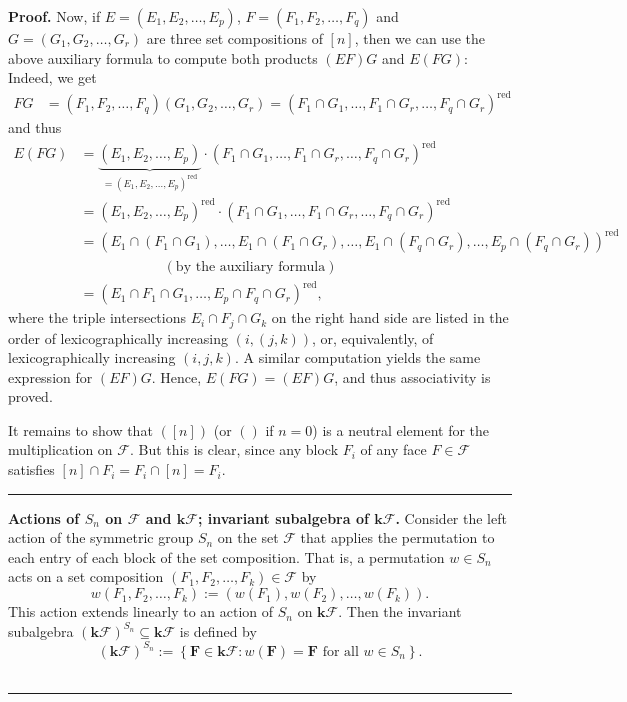 \documentclass[12pt]{article}
\theoremstyle{definition}%
\theoremstyle{definition}%
\newtheorem{defn}[thm]{Definition}
\theoremstyle{remark}%
\newcommand{\tup}[1]{\left( #1 \right)}
\newcommand{\interval}[1]{\left[ #1 \right]} %
\newcommand{\set}[1]{\left\{ #1 \right\}}
\newcommand{\kk}{\mathbf{k}}
\newcommand{\kf}{\kk\mathcal{F}}
\newcommand{\kfsn}{\left(\kf\right)^{S_n}}
\newcommand{\FF}{\mathbf{F}}
\newcommand{\CF}{\mathcal{F}}
\newcommand{\red}{\operatorname{red}}
\newenvironment{defn}[1][Definition]{\noindent\textbf{#1.} }{\ \rule{0.5em}{0.5em}}
\newenvironment{proof}[1][Proof]{\noindent\textbf{#1.} }{\ \rule{0.5em}{0.5em}}
\begin{document}
\begin{proof}
Now, if $E = \tup{E_1, E_2, \ldots, E_p}$, $F = \tup{F_1, F_2, \ldots, F_q}$ and $G = \tup{G_1, G_2, \ldots, G_r}$ are three set compositions of $\interval{n}$, then we can use the above auxiliary formula to compute both products $\tup{EF} G$ and $E \tup{FG}$: Indeed, we get
\begin{align*}
F G  & = \tup{  F_{1},F_{2},\ldots,F_{q} }
\tup{ G_{1},G_{2},\ldots,G_{r} }
= \tup{ F_{1}\cap G_{1},\ldots,F_{1}\cap G_{r},\ldots,F_{q}\cap
G_{r} }^{\red}
\end{align*}
and thus
\begin{align*}
E \tup{F G}
& =
\underbrace{\tup{ E_{1},E_{2},\ldots ,E_{p} }}_{=
\tup{ E_{1},E_{2},\ldots,E_{p} }^{\red} }
\cdot\tup{ F_{1}\cap G_{1},\ldots,F_{1}\cap G_{r}
,\ldots,F_{q}\cap G_{r} }^{\red}\\
& = \tup{ E_{1},E_{2},\ldots,E_{p} }^{\red}
\cdot \tup{ F_{1}\cap G_{1},\ldots,F_{1}\cap G_{r},
\ldots,F_{q}\cap G_{r} }^{\red}\\
& = \tup{ E_{1}\cap\tup{ F_{1}\cap G_{1} }, \ldots,
E_{1}\cap\tup{ F_{1}\cap G_{r} }, \ldots,
E_{1}\cap\tup{ F_{q}\cap G_{r} }, \ldots,
E_{p}\cap\tup{ F_{q}\cap G_{r} } }^{\red} \\
& \qquad \qquad \qquad
\left(  \text{by the auxiliary formula}\right)  \\
& = \tup{ E_{1}\cap F_{1}\cap G_{1}, \ldots,
E_{p}\cap F_{q}\cap G_{r} }^{\red},
\end{align*}
where the triple intersections $E_i \cap F_j \cap G_k$ on the
right hand side are listed in the order of lexicographically
increasing $\tup{i, \tup{j, k}}$, or, equivalently, of
lexicographically increasing $\tup{i, j, k}$. A similar
computation yields the same expression for $\tup{E F} G$. Hence,
$E \tup{FG} = \tup{EF} G$, and thus associativity is proved.

It remains to show that $\tup{\interval{n}}$ (or $\tup{}$ if
$n=0$) is a neutral element for the multiplication on $\CF$.
But this is clear, since any block $F_i$ of any face $F \in \CF$
satisfies $\interval{n} \cap F_i = F_i \cap \interval{n} = F_i$.
\end{proof}

\begin{defn}[Actions of $S_n$ on $\CF$ and $\kf$; invariant subalgebra of $ \kf $]
    \label{kfsn_defn}
    Consider the left action of the symmetric group $ S_n $ on the set $ \CF $ that applies the permutation to each entry of each block of the set composition.
	That is, a permutation $ w \in S_n $ acts on a set composition $ \tup{ F_{1}, F_{2},\dots,F_k } \in \CF $ by
    \[
        w\tup{ F_{1}, F_{2},\dots,F_k } := \tup{ w\tup{ F_{1} }, w \tup{ F_{2} },\dots,w\tup{ F_k }}.
    \]
    This action extends linearly to an action of $S_n$ on $ \kf $. Then the invariant subalgebra $ \kfsn \subseteq \kf $ is defined by
    \[
    \kfsn := \set{\FF \in \kf : w\tup{ \FF } = \FF \text{ for all } w \in S_n}.
    \]
\end{defn}
\end{document}
